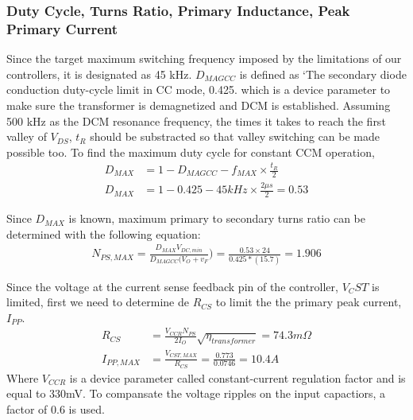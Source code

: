 \subsubsection*{Duty Cycle, Turns Ratio, Primary Inductance, Peak Primary Current}
Since the target maximum switching frequency imposed by the limitations of our controllers, it is designated as 45 kHz. $D_{MAGCC}$ is defined as `The secondary diode conduction duty-cycle limit in CC mode, 0.425. which is a device parameter to make sure the transformer is demagnetized and DCM is established. Assuming 500 kHz as the DCM resonance frequency, the times it takes to reach the first valley of $V_{DS}$, $t_R$ should be substracted so that valley switching can be made possible too. To find the maximum duty cycle for constant CCM operation,
\begin{align*}
D_{MAX}&=1-D_{MAGCC}-f_{MAX}\times\frac{t_R}{2}\\
D_{MAX}&=1-0.425-45kHz\times \frac{2 \mu s}{2}=0.53
\end{align*}
\par Since $D_{MAX}$ is known, maximum primary to secondary turns ratio can be determined with the following equation:
\begin{align*}
    N_{PS,MAX}=\frac{D_{MAX} V_{DC,min}}{D_{MAGCC}(V_{O}+v_F})=\frac{0.53\times 24}{0.425*(15.7)}=1.906
\end{align*}

Since the voltage at the current sense feedback pin of the controller, $V_CST$ is limited, first we need to determine de $R_{CS}$ to limit the the primary peak current,$I_{PP}$.
\begin{align*}
    R_{CS}&=\frac{V_{CCR}N_{PS}}{2I_{O}}\sqrt{\eta_{transformer}}=74.3m\Omega\\
    I_{PP,MAX}&=\frac{V_{CST,MAX}}{R_{CS}}=\frac{0.773}{0.0746}=10.4A
\end{align*}
Where $V_{CCR}$ is a device parameter called constant-current regulation factor and is equal to 330mV.
To compansate the voltage ripples on the input capactiors, a factor of 0.6 is used. 



